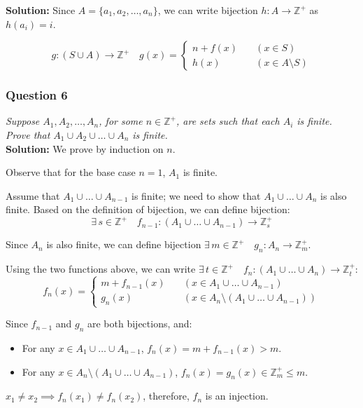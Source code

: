 \documentclass[
	letterpaper, %
	11pt, %
]{CSUniSchoolLabReport}
\begin{document}
\textbf{Solution:} Since $A = \{a_1, a_2, \ldots, a_n\}$, we can write bijection $h: A \to \mathbb{Z}^+$ as $h(a_i) = i$.

\[
g: (S \cup A) \to \mathbb{Z}^+ \quad g(x) = \begin{cases}
n + f(x) & \quad (x \in S) \\
h(x) & \quad (x \in A \setminus S)
\end{cases}
\]

\pagebreak

\subsubsection*{Question 6}
\textit{Suppose $A_1, A_2, \ldots, A_n$, for some $n \in \mathbb{Z}^+$, are sets such that each $A_i$ is finite. Prove that $A_1 \cup A_2 \cup \ldots \cup A_n$ is finite.} \\

\textbf{Solution:} We prove by induction on $n$.

Observe that for the base case $n=1$, $A_1$ is finite.

Assume that $A_1 \cup \ldots \cup A_{n-1}$ is finite; we need to show that $A_1 \cup \ldots \cup A_n$ is also finite.
Based on the definition of bijection, we can define bijection:
\[
\exists\, s \in \mathbb{Z}^+ \quad f_{n-1}: (A_1 \cup \ldots \cup A_{n-1}) \to \mathbb{Z}^+_s
\]

Since $A_n$ is also finite, we can define bijection $\exists\, m \in \mathbb{Z}^+ \quad g_n: A_n \to \mathbb{Z}^+_m$.

Using the two functions above, we can write $\exists\, t \in \mathbb{Z}^+ \quad f_n: (A_1 \cup \ldots \cup A_n) \to \mathbb{Z}^+_t$:
\[
f_n(x) = \begin{cases}
m + f_{n-1}(x) & \quad (x \in A_1 \cup \ldots \cup A_{n-1}) \\
g_n(x) & \quad (x \in A_n \setminus (A_1 \cup \ldots \cup A_{n-1}))
\end{cases}
\]

Since $f_{n-1}$ and $g_n$ are both bijections, and:
\begin{itemize}
	\item For any $x \in A_1 \cup \ldots \cup A_{n-1}$, $f_n(x) = m + f_{n-1}(x) > m$.
	\item For any $x \in A_n \setminus (A_1 \cup \ldots \cup A_{n-1})$, $f_n(x) = g_n(x) \in \mathbb{Z}^+_m \leq m$.
\end{itemize}

$x_1 \neq x_2 \implies f_n(x_1) \neq f_n(x_2)$, therefore, $f_n$ is an injection.
\end{document}
